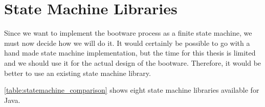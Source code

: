 \section{State Machine Libraries}
\label{implementation:selecting:statemachine}

Since we want to implement the bootware process as a finite state machine, we must now decide how we will do it.
It would certainly be possible to go with a hand made state machine implementation, but the time for this thesis is limited and we should use it for the actual design of the bootware.
Therefore, it would be better to use an existing state machine library.

\autoref{table:statemachine_comparison} shows eight state machine libraries available for Java.

\vspace*{\baselineskip}
\begingroup
	\centering
	\captionsetup{type=table}
